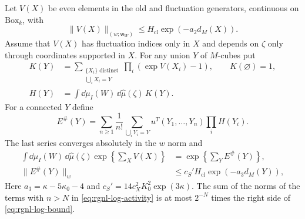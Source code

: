 \begin{proposition}\label{prop:rgnl-cluster-logarithm}
Let $V(X)$ be even elements in the old and fluctuation
generators, continuous on $\mathrm{Box}_k$, with
\[
 \|V(X)\|_{(w;\mathsf w_W)}
                       \le H_{\mathrm{cl}}\exp(-a_2d_M(X)).
\]
Assume that $V(X)$ has fluctuation indices only in $X$ and
depends on $\zeta$ only through coordinates supported in $X$.
For any union $Y$ of $M$-cubes put
\begin{align}
 K(Y)&=\sum_{\substack{\{X_i\}\text{ distinct}\\\bigcup_iX_i=Y}}
                    \prod_i(\exp V(X_i)-1),\qquad K(\varnothing)=1,
                                      \label{eq:rgnl-Mayer-activity}\\
 H(Y)&=\int\dd\mu_I(W)\,\dd\widehat\mu(\zeta)\,K(Y).
                                      \label{eq:rgnl-integrated-activity}
\end{align}
For a connected $Y$ define
\begin{equation}\label{eq:rgnl-log-activity}
 E^\#(Y)=\sum_{n\ge1}\frac1{n!}
   \sum_{\bigcup_iY_i=Y}u^T(Y_1,\ldots,Y_n)\prod_iH(Y_i).
\end{equation}
The last series converges absolutely in the $w$ norm and
\begin{align}
 \int\dd\mu_I(W)\,\dd\widehat\mu(\zeta)
                         \exp\left\{\sum_XV(X)\right\}
       &=\exp\left\{\sum_YE^\#(Y)\right\},
                                      \label{eq:rgnl-log-identity}\\
 \|E^\#(Y)\|_w
       &\le c_S'H_{\mathrm{cl}}\exp(-a_3d_M(Y)),
                                      \label{eq:rgnl-log-bound}
\end{align}
Here $a_3=\kappa-5\kappa_0-4$ and
$c_S'=14c_X^2K_0^2\exp(3\kappa)$.
The sum of the norms of the terms with $n>N$ in
\eqref{eq:rgnl-log-activity} is at most $2^{-N}$ times the
right side of \eqref{eq:rgnl-log-bound}.
\end{proposition}

